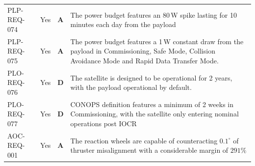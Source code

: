 \documentclass[a4paper, 11pt, conference]{IEEEtran}
\begin{document}
\begin{table}[H]
\begin{tabularx}{\textwidth}{l c c X}
PLP-REQ-074 & Yes & \textbf{A} & The power budget features an 80\,W spike lasting for 10 minutes each day from the payload \\
PLP-REQ-075 & Yes & \textbf{A} & The power budget features a 1\,W constant draw from the payload in Commissioning, Safe Mode, Collision Avoidance Mode and Rapid Data Transfer Mode. \\
PLO-REQ-076 & Yes & \textbf{D} & The satellite is designed to be operational for 2 years, with the payload operational by default. \\
PLO-REQ-077 & Yes & \textbf{D} & CONOPS definition features a minimum of 2 weeks in Commissioning, with the satellite only entering nominal operations post IOCR\label(nom:iocr) \\
AOC-REQ-001 & Yes & \textbf{A} & The reaction wheels are capable of counteracting $0.1^\circ$ of thruster misalignment with a considerable margin of $291\%$ \\
\bottomrule
\end{tabularx}
\end{table}
\end{document}
